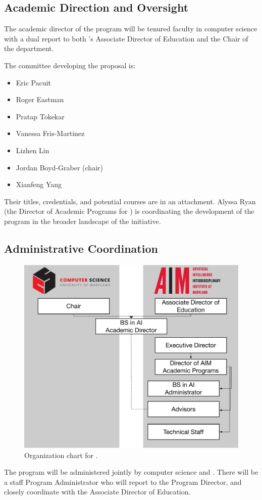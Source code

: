 
\subsection{Academic Direction and Oversight}

The academic director of the program will be tenured faculty in computer
science with a dual report to both \aim{}'s Associate Director of
Education and the Chair of the  department.

The committee developing the proposal is:
\begin{itemize}
    \item Eric Pacuit
    \item Roger Eastman
    \item Pratap Tokekar
    \item Vanessa Fris-Martinez
    \item Lizhen Lin
    \item Jordan Boyd-Graber (chair)
    \item Xianfeng Yang
\end{itemize}

Their titles, credentials, and potential courses are in an
attachment.  Alyssa Ryan (the Director of Academic Programs for
) is coordinating the development of the program in the
broader landscape of the  initiative.

\subsection{Administrative Coordination}

\begin{figure}
  \begin{center}
    \includegraphics[width=0.5\linewidth]{figures/aim_org_chart}
  \end{center}
  \caption{Organization chart for \short{}.}
  \label{fig:org_chart}
\end{figure}

The program will be administered jointly by computer science and \aim{}. There will be a staff Program Administrator who will report to the Program Director, and closely coordinate with the \aim{} Associate Director of Education.